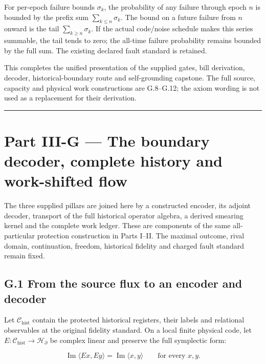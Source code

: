 \documentclass[
]{article}
\begin{document}
For per-epoch failure bounds \(\sigma_k\), the probability of any
failure through epoch \(n\) is bounded by the prefix sum
\(\sum_{k\le n}\sigma_k\). The bound on a future failure from \(n\)
onward is the tail \(\sum_{k\ge n}\sigma_k\). If the actual code/noise
schedule makes this series summable, the tail tends to zero; the
all-time failure probability remains bounded by the full sum. The
existing declared fault standard is retained.

This completes the unified presentation of the supplied gates, bill
derivation, decoder, historical-boundary route and self-grounding
capstone. The full source, capacity and physical work constructions are
G.8--G.12; the axiom wording is not used as a replacement for their
derivation.

\begin{center}\rule{0.5\linewidth}{0.5pt}\end{center}

\section{Part III-G --- The boundary decoder, complete history and
work-shifted
flow}\label{part-iii-g-the-boundary-decoder-complete-history-and-work-shifted-flow}

The three supplied pillars are joined here by a constructed encoder, its
adjoint decoder, transport of the full historical operator algebra, a
derived smearing kernel and the complete work ledger. These are
components of the same all-particular protection construction in Parts
I--II. The maximal outcome, rival domain, continuation, freedom,
historical fidelity and charged fault standard remain fixed.

\subsection{G.1 From the source flux to an encoder and
decoder}\label{g.1-from-the-source-flux-to-an-encoder-and-decoder}

Let \(\mathcal C_{\mathrm{hist}}\) contain the protected historical
registers, their labels and relational observables at the original
fidelity standard. On a local finite physical code, let
\(E:\mathcal C_{\mathrm{hist}}\to\mathcal H_\partial\) be complex linear
and preserve the full symplectic form:

\[
\operatorname{Im}\langle Ex,Ey\rangle
=\operatorname{Im}\langle x,y\rangle\qquad\text{for every }x,y.
\]
\end{document}
